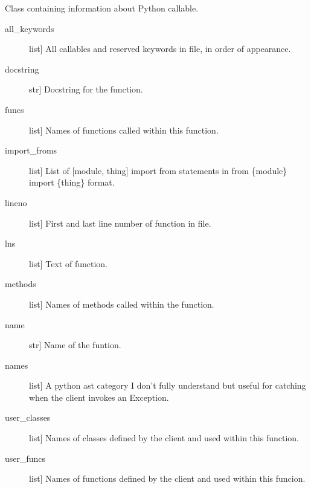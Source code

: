 \documentclass[letterpaper,10pt,english]{sphinxmanual}
\begin{document}
\begin{fulllineitems}
\label{\detokenize{index:unicity.FunctionInfo}}
Class containing information about Python callable.
\begin{description}
\item[{all\_keywords}] \leavevmode{[}list{]}
All callables and reserved keywords in file, in order of appearance.

\item[{docstring}] \leavevmode{[}str{]}
Docstring for the function.

\item[{funcs}] \leavevmode{[}list{]}
Names of functions called within this function.

\item[{import\_froms}] \leavevmode{[}list{]}
List of {[}module, thing{]} import from statements in from \{module\} import \{thing\} format.

\item[{lineno}] \leavevmode{[}list{]}
First and last line number of function in file.

\item[{lns}] \leavevmode{[}list{]}
Text of function.

\item[{methods}] \leavevmode{[}list{]}
Names of methods called within the function.

\item[{name}] \leavevmode{[}str{]}
Name of the funtion.

\item[{names}] \leavevmode{[}list{]}
A python ast category I don’t fully understand but useful for catching when
the client invokes an Exception.

\item[{user\_classes}] \leavevmode{[}list{]}
Names of classes defined by the client and used within this function.

\item[{user\_funcs}] \leavevmode{[}list{]}
Names of functions defined by the client and used within this funcion.

\end{description}

\end{fulllineitems}

\end{document}
